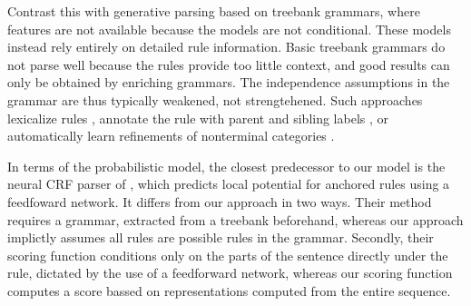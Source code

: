   Contrast this with generative parsing based on treebank grammars, where features are not available because the models are not conditional. These models instead rely entirely on detailed rule information. Basic treebank grammars do not parse well because the rules provide too little context, and good results can only be obtained by enriching grammars. The independence assumptions in the grammar are thus typically weakened, not strengtehened. Such approaches lexicalize rules \citep{collins2003head}, annotate the rule with parent and sibling labels \citep{klein2003accurate}, or automatically learn refinements of nonterminal categories \citep{petrov2006learning}.

  In terms of the probabilistic model, the closest predecessor to our model is the neural CRF parser of \citet{klein2015crf}, which predicts local potential for anchored rules using a feedfoward network. It differs from our approach in two ways. Their method requires a grammar, extracted from a treebank beforehand, whereas our approach implictly assumes all rules are possible rules in the grammar. Secondly, their scoring function conditions only on the parts of the sentence directly under the rule, dictated by the use of a feedforward network, whereas our scoring function computes a score bassed on representations computed from the entire sequence.


